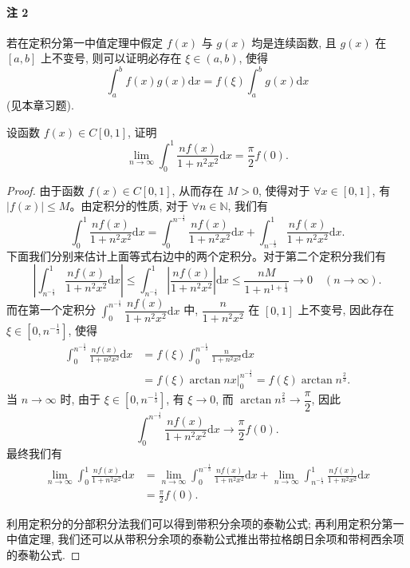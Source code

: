 \paragraph*{注 2}
若在定积分第一中值定理中假定 $f(x)$ 与 $g(x)$ 均是连续函数, 且 $g(x)$ 在 $[a,b]$ 上不变号, 则可以证明必存在 $\xi\in(a,b)$, 使得
\[
  \int_a^b f(x)g(x)\mathrm dx=f(\xi)\int_a^b g(x)\mathrm dx
\]
(见本章习题).

\begin{example}\label{example:ma-7-5-1}
设函数 $f(x)\in C[0,1]$, 证明
\[
  \lim_{n\to\infty}\int_0^1\frac{nf(x)}{1+n^2x^2}\mathrm dx=\frac{\pi}{2}f(0).
\]
\end{example}


\begin{proof}
由于函数 $f(x)\in C[0,1]$, 从而存在 $M>0$, 使得对于 $\forall x\in[0,1]$, 有 $|f(x)|\leq M$。由定积分的性质, 对于 $\forall n\in\mathbb N$, 我们有
\[
  \int_0^1\frac{nf(x)}{1+n^2x^2}\mathrm dx
  =\int_0^{n^{-\frac13}}\frac{nf(x)}{1+n^2x^2}\mathrm dx
  +\int_{n^{-\frac13}}^1\frac{nf(x)}{1+n^2x^2}\mathrm dx.
\]
下面我们分别来估计上面等式右边中的两个定积分。对于第二个定积分我们有
\[
  \left|\int_{n^{-\frac13}}^1\frac{nf(x)}{1+n^2x^2}\mathrm dx\right|
  \leq\int_{n^{-\frac13}}^1\left|\frac{nf(x)}{1+n^2x^2}\right|\mathrm dx
  \leq\frac{nM}{1+n^{1+\frac13}}\to0\quad(n\to\infty).
\]
而在第一个定积分 $\int_0^{n^{-\frac13}}\dfrac{nf(x)}{1+n^2x^2}\mathrm dx$ 中, $\dfrac{n}{1+n^2x^2}$ 在 $[0,1]$ 上不变号, 因此存在 $\xi\in[0,n^{-\frac13}]$, 使得
\[
\begin{aligned}
  \int_0^{n^{-\frac13}}\frac{nf(x)}{1+n^2x^2}\mathrm dx
  &=f(\xi)\int_0^{n^{-\frac13}}\frac{n}{1+n^2x^2}\mathrm dx\\
  &=\left.f(\xi)\arctan nx\right|_0^{n^{-\frac13}}
  =f(\xi)\arctan n^{\frac23}.
\end{aligned}
\]
当 $n\to\infty$ 时, 由于 $\xi\in[0,n^{-\frac13}]$, 有 $\xi\to0$, 而 $\arctan n^{\frac23}\to\dfrac{\pi}{2}$, 因此
\[
  \int_0^{n^{-\frac13}}\frac{nf(x)}{1+n^2x^2}\mathrm dx\to\frac{\pi}{2}f(0).
\]
最终我们有
\[
\begin{aligned}
  \lim_{n\to\infty}\int_0^1\frac{nf(x)}{1+n^2x^2}\mathrm dx
  &=\lim_{n\to\infty}\int_0^{n^{-\frac13}}\frac{nf(x)}{1+n^2x^2}\mathrm dx
  +\lim_{n\to\infty}\int_{n^{-\frac13}}^1\frac{nf(x)}{1+n^2x^2}\mathrm dx\\
  &=\frac{\pi}{2}f(0).
\end{aligned}
\]

利用定积分的分部积分法我们可以得到带积分余项的泰勒公式; 再利用定积分第一中值定理, 我们还可以从带积分余项的泰勒公式推出带拉格朗日余项和带柯西余项的泰勒公式.
\end{proof}


